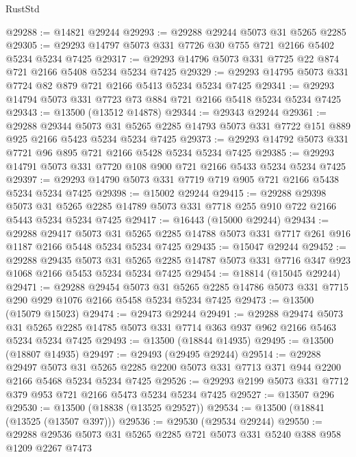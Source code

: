 \begin{lexlean}{RustStd}
\begin{coremodule}
@29288 := @14821 @29244
@29293 := @29288 @29244 @5073 @31 @5265 @2285
@29305 := @29293 @14797 @5073 @331 @7726 @30 @755 @721 @2166 @5402 @5234 @5234 @7425
@29317 := @29293 @14796 @5073 @331 @7725 @22 @874 @721 @2166 @5408 @5234 @5234 @7425
@29329 := @29293 @14795 @5073 @331 @7724 @82 @879 @721 @2166 @5413 @5234 @5234 @7425
@29341 := @29293 @14794 @5073 @331 @7723 @73 @884 @721 @2166 @5418 @5234 @5234 @7425
@29343 := @13500 (@13512 @14878)
@29344 := @29343 @29244
@29361 := @29288
    @29344
    @5073
    @31
    @5265
    @2285
    @14793
    @5073
    @331
    @7722
    @151
    @889
    @925
    @2166
    @5423
    @5234
    @5234
    @7425
@29373 := @29293 @14792 @5073 @331 @7721 @96 @895 @721 @2166 @5428 @5234 @5234 @7425
@29385 := @29293 @14791 @5073 @331 @7720 @108 @900 @721 @2166 @5433 @5234 @5234 @7425
@29397 := @29293 @14790 @5073 @331 @7719 @719 @905 @721 @2166 @5438 @5234 @5234 @7425
@29398 := @15002 @29244
@29415 := @29288
    @29398
    @5073
    @31
    @5265
    @2285
    @14789
    @5073
    @331
    @7718
    @255
    @910
    @722
    @2166
    @5443
    @5234
    @5234
    @7425
@29417 := @16443 (@15000 @29244)
@29434 := @29288
    @29417
    @5073
    @31
    @5265
    @2285
    @14788
    @5073
    @331
    @7717
    @261
    @916
    @1187
    @2166
    @5448
    @5234
    @5234
    @7425
@29435 := @15047 @29244
@29452 := @29288
    @29435
    @5073
    @31
    @5265
    @2285
    @14787
    @5073
    @331
    @7716
    @347
    @923
    @1068
    @2166
    @5453
    @5234
    @5234
    @7425
@29454 := @18814 (@15045 @29244)
@29471 := @29288
    @29454
    @5073
    @31
    @5265
    @2285
    @14786
    @5073
    @331
    @7715
    @290
    @929
    @1076
    @2166
    @5458
    @5234
    @5234
    @7425
@29473 := @13500 (@15079 @15023)
@29474 := @29473 @29244
@29491 := @29288
    @29474
    @5073
    @31
    @5265
    @2285
    @14785
    @5073
    @331
    @7714
    @363
    @937
    @962
    @2166
    @5463
    @5234
    @5234
    @7425
@29493 := @13500 (@18844 @14935)
@29495 := @13500 (@18807 @14935)
@29497 := @29493 (@29495 @29244)
@29514 := @29288
    @29497
    @5073
    @31
    @5265
    @2285
    @2200
    @5073
    @331
    @7713
    @371
    @944
    @2200
    @2166
    @5468
    @5234
    @5234
    @7425
@29526 := @29293 @2199 @5073 @331 @7712 @379 @953 @721 @2166 @5473 @5234 @5234 @7425
@29527 := @13507 @296
@29530 := @13500 (@18838 (@13525 @29527))
@29534 := @13500 (@18841 (@13525 (@13507 @397)))
@29536 := @29530 (@29534 @29244)
@29550 := @29288 @29536 @5073 @31 @5265 @2285 @721 @5073 @331 @5240 @388 @958 @1209 @2267 @7473

\end{coremodule}
\end{lexlean}
